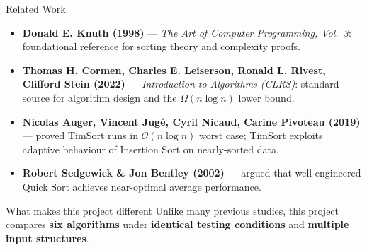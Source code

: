 \documentclass[aspectratio=169]{beamer}
\begin{document}
\begin{frame}{Related Work}
  \begin{itemize}
    \item \textbf{Donald E. Knuth (1998)} --- \textit{The Art of Computer Programming, Vol.~3}:
          foundational reference for sorting theory and complexity proofs.

    \vspace{0.4em}
    \item \textbf{Thomas H. Cormen, Charles E. Leiserson, Ronald L. Rivest,\\
          Clifford Stein (2022)} --- \textit{Introduction to Algorithms (CLRS)}:
          standard source for algorithm design and the $\Omega(n \log n)$ lower bound.

    \vspace{0.4em}
    \item \textbf{Nicolas Auger, Vincent Jug\'e, Cyril Nicaud, Carine Pivoteau (2019)}
          --- proved TimSort runs in $\mathcal{O}(n \log n)$ worst case; TimSort exploits
          adaptive behaviour of Insertion Sort on nearly-sorted data.

    \vspace{0.4em}
    \item \textbf{Robert Sedgewick \& Jon Bentley (2002)} --- argued that well-engineered
          Quick Sort achieves near-optimal average performance.
  \end{itemize}

  \vspace{0.5em}
  \begin{block}{What makes this project different}
    Unlike many previous studies, this project compares \textbf{six algorithms} under
    \textbf{identical testing conditions} and \textbf{multiple input structures}.
  \end{block}
\end{frame}
\end{document}
